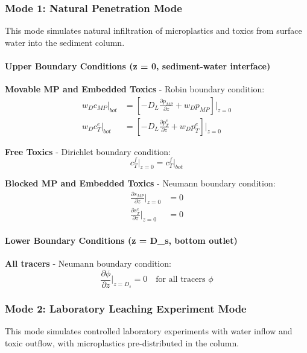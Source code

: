 \documentclass[11pt,a4paper]{article}
\begin{document}
\subsubsection{Mode 1: Natural Penetration Mode}

This mode simulates natural infiltration of microplastics and toxics from surface water into the sediment column.

\paragraph{Upper Boundary Conditions (z = 0, sediment-water interface)}

\textbf{Movable MP and Embedded Toxics} - Robin boundary condition:
\begin{align}
w_D c_{MP}|_{bot} &= \left[-D_L \frac{\partial p_{MP}}{\partial z} + w_D p_{MP}\right]\bigg|_{z=0} \\[0.5em]
w_D c_T^e|_{bot} &= \left[-D_L \frac{\partial p_T^e}{\partial z} + w_D p_T^e\right]\bigg|_{z=0}
\end{align}

\textbf{Free Toxics} - Dirichlet boundary condition:
\begin{equation}
c_T^f\big|_{z=0} = c_T^f|_{bot}
\end{equation}

\textbf{Blocked MP and Embedded Toxics} - Neumann boundary condition:
\begin{align}
\frac{\partial s_{MP}}{\partial z}\bigg|_{z=0} &= 0 \\[0.5em]
\frac{\partial s_T^e}{\partial z}\bigg|_{z=0} &= 0
\end{align}

\paragraph{Lower Boundary Conditions (z = D_s, bottom outlet)}

\textbf{All tracers} - Neumann boundary condition:
\begin{equation}
\frac{\partial \phi}{\partial z}\bigg|_{z=D_s} = 0 \quad \text{for all tracers } \phi
\end{equation}

\subsubsection{Mode 2: Laboratory Leaching Experiment Mode}

This mode simulates controlled laboratory experiments with water inflow and toxic outflow, with microplastics pre-distributed in the column.
\end{document}
